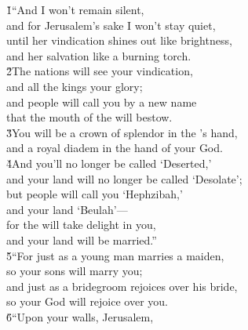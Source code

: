 \begin{poetry}
\poeml {}
\v{1}``And I won't remain silent, \\
\poemll    and for Jerusalem's sake I won't stay quiet, \\
\poeml until her vindication shines out like brightness, \\
\poemll    and her salvation like a burning torch. \\
\poeml \v{2}The nations will see your vindication, \\
\poemll    and all the kings your glory; \\
\poeml and people will call you by a new name \\
\poemll    that the mouth of the  will bestow. \\
\poeml \v{3}You will be a crown of splendor in the 's hand, \\
\poemll    and a royal diadem in the hand of your God. \\
\poeml \v{4}And you'll no longer be called `Deserted,' \\
\poemll    and your land will no longer be called `Desolate'; \\
\poeml but people will call you `Hephzibah,' \\
\poemll    and your land `Beulah'--- \\
\poeml for the  will take delight in you, \\
\poemll    and your land will be married.'' \\
\poeml \v{5}``For just as a young man marries a maiden, \\
\poemll    so your sons will marry you; \\
\poeml and just as a bridegroom rejoices over his bride, \\
\poemll    so your God will rejoice over you. \\
\poeml \v{6}``Upon your walls, Jerusalem, \\

\end{poetry}
